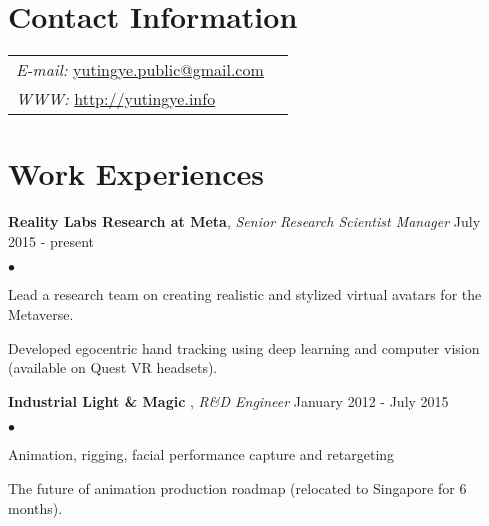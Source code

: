 \documentclass[margin,line]{res}
\newenvironment{list2}{
  \begin{list}{$\bullet$}{%
      \setlength{\itemsep}{0in}
      \setlength{\parsep}{0in} \setlength{\parskip}{0in}
      \setlength{\topsep}{0in} \setlength{\partopsep}{0in} 
      \setlength{\leftmargin}{0.2in}}}{\end{list}}
\begin{document}

\begin{resume}
\section{\sc Contact Information}
\vspace{.05in}
\begin{tabular}{@{}p{3in}p{3in}}
{\it E-mail:}    \href{mailto:yutingye.public@gmail.com}{yutingye.public@gmail.com} \\
{\it WWW:}  \href{http://yutingye.info}{http://yutingye.info} \\ 
\end{tabular}

\section{\sc Work Experiences}
{\bf Reality Labs Research at Meta}, {\em Senior Research Scientist Manager}  \hfill July 2015 - present \\
\begin{list2}
\vspace*{-.15in}
\item Lead a research team on creating realistic and stylized virtual avatars for the Metaverse.
\item Developed egocentric  hand tracking using deep learning and computer vision (available on Quest VR headsets).
\end{list2}

{\bf Industrial Light \& Magic} , {\em R\&D Engineer} \hfill January 2012 - July 2015 \\
\begin{list2}
\vspace*{-.15in}
\item Animation, rigging,  facial performance capture and retargeting
\item The future of animation production roadmap (relocated to Singapore for 6 months).
\end{list2}


\end{resume}
\end{document}
